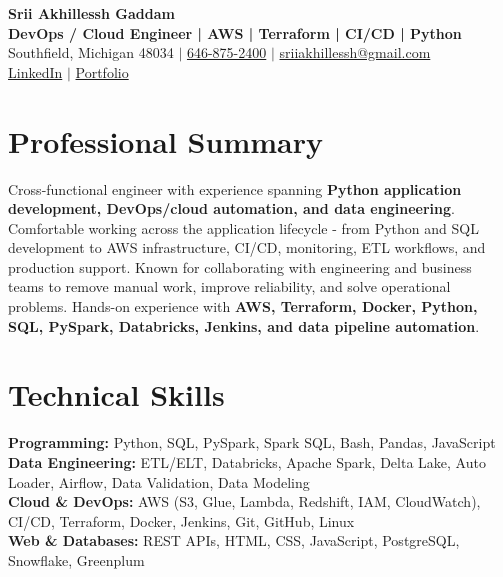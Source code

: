 \documentclass[letterpaper,10pt]{article}
\begin{document}
\fontsize{9.35pt}{10.45pt}\selectfont

\begin{center}
    {\LARGE \textbf{Srii Akhillessh Gaddam}} \\[-1pt]
    \textbf{DevOps / Cloud Engineer | AWS | Terraform | CI/CD | Python} \\[2pt]
    Southfield, Michigan 48034 $|$
    \href{tel:6468752400}{646-875-2400} $|$
    \href{mailto:sriiakhillessh@gmail.com}{sriiakhillessh@gmail.com} \\[1pt]
    \href{https://www.linkedin.com/in/srii-akhiilessh-gaddam-b48668191/}{LinkedIn} $|$
    \href{https://sriiakhillesshg.github.io/portfolio/}{Portfolio}
\end{center}
\vspace{-8pt}

\section{Professional Summary}
\small{Cross-functional engineer with experience spanning \textbf{Python application development, DevOps/cloud automation, and data engineering}. Comfortable working across the application lifecycle - from Python and SQL development to AWS infrastructure, CI/CD, monitoring, ETL workflows, and production support. Known for collaborating with engineering and business teams to remove manual work, improve reliability, and solve operational problems. Hands-on experience with \textbf{AWS, Terraform, Docker, Python, SQL, PySpark, Databricks, Jenkins, and data pipeline automation}.}

\section{Technical Skills}
\small{
\textbf{Programming:} Python, SQL, PySpark, Spark SQL, Bash, Pandas, JavaScript \\
\textbf{Data Engineering:} ETL/ELT, Databricks, Apache Spark, Delta Lake, Auto Loader, Airflow, Data Validation, Data Modeling \\
\textbf{Cloud \& DevOps:} AWS (S3, Glue, Lambda, Redshift, IAM, CloudWatch), CI/CD, Terraform, Docker, Jenkins, Git, GitHub, Linux \\
\textbf{Web \& Databases:} REST APIs, HTML, CSS, JavaScript, PostgreSQL, Snowflake, Greenplum
}
\end{document}
